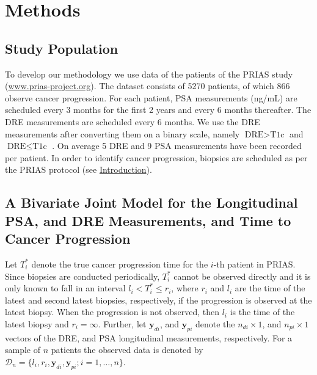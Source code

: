 
\section{Methods}
\label{sec:methods}
\subsection{Study Population}
To develop our methodology we use data of the patients of the PRIAS study (\url{www.prias-project.org}). The dataset consists of 5270 patients, of which 866 observe cancer progression. For each patient, PSA measurements (ng/mL) are scheduled every 3 months for the first 2 years and every 6 months thereafter. The DRE measurements are scheduled every 6 months. We use the DRE measurements after converting them on a binary scale, namely $\mbox{DRE} > \mbox{T1c}$ and $\mbox{DRE} \leq \mbox{T1c}$ \cite{schroder1992tnm}. On average 5 DRE and 9 PSA measurements have been recorded per patient. In order to identify cancer progression, biopsies are scheduled as per the PRIAS protocol (see \hyperref[sec:introduction]{Introduction}).

\subsection{A Bivariate Joint Model for the Longitudinal PSA, and DRE Measurements, and Time to Cancer Progression}
Let $T_i^*$ denote the true cancer progression time for the $i$-th patient in PRIAS. Since biopsies are conducted periodically, $T_i^*$ cannot be observed directly and it is only known to fall in an interval ${l_i < T_i^* \leq r_i}$, where $r_i$ and $l_i$ are the time of the latest and second latest biopsies, respectively, if the progression is observed at the latest biopsy. When the progression is not observed, then $l_i$ is the time of the latest biopsy and $r_i = \infty$. Further, let $\boldsymbol{y}_{di}$, and $\boldsymbol{y}_{pi}$ denote the $n_{di} \times 1$, and $n_{pi} \times 1$ vectors of the DRE, and PSA longitudinal measurements, respectively. For a sample of $n$ patients the observed data is denoted by ${\mathcal{D}_n = \{l_i, r_i, \boldsymbol{y}_{di}, \boldsymbol{y}_{pi}; i = 1, \ldots, n\}}$.

